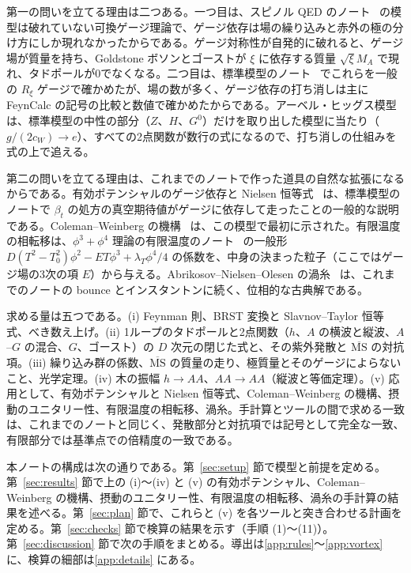 \documentclass[a4paper,10pt]{ltjsarticle}
\newcommand{\MSbar}{\overline{\mathrm{MS}}}
\begin{document}
第一の問いを立てる理由は二つある。一つ目は、スピノル QED のノート~\cite{qednote} の模型は破れていない可換ゲージ理論で、ゲージ依存は場の繰り込みと赤外の極の分け方にしか現れなかったからである。ゲージ対称性が自発的に破れると、ゲージ場が質量を持ち、Goldstone ボソンとゴーストが $\xi$ に依存する質量 $\sqrt\xi M_A$ で現れ、タドポールが0でなくなる。二つ目は、標準模型のノート~\cite{smnote} でこれらを一般の $R_\xi$ ゲージで確かめたが、場の数が多く、ゲージ依存の打ち消しは主に FeynCalc の記号の比較と数値で確かめたからである。アーベル・ヒッグス模型は、標準模型の中性の部分（$Z$、$H$、$G^0$）だけを取り出した模型に当たり（$g/(2c_W)\to e$）、すべての2点関数が数行の式になるので、打ち消しの仕組みを式の上で追える。

第二の問いを立てる理由は、これまでのノートで作った道具の自然な拡張になるからである。有効ポテンシャルのゲージ依存と Nielsen 恒等式~\cite{nielsen75} は、標準模型のノートで $\beta_t$ の処方の真空期待値がゲージに依存して走ったことの一般的な説明である。Coleman--Weinberg の機構~\cite{cw73} は、この模型で最初に示された。有限温度の相転移は、$\phi^3+\phi^4$ 理論の有限温度のノート~\cite{thermalnote} の一般形 $D(T^2-T_0^2)\phi^2-ET\phi^3+\lambda_T\phi^4/4$ の係数を、中身の決まった粒子（ここではゲージ場の3次の項 $E$）から与える。Abrikosov--Nielsen--Olesen の渦糸~\cite{abrikosov57,no73} は、これまでのノートの bounce とインスタントンに続く、位相的な古典解である。

求める量は五つである。(i) Feynman 則、BRST 変換と Slavnov--Taylor 恒等式、べき数え上げ。(ii) 1ループのタドポールと2点関数（$h$、$A$ の横波と縦波、$A$--$G$ の混合、$G$、ゴースト）の $D$ 次元の閉じた式と、その紫外発散と $\MSbar$ の対抗項。(iii) 繰り込み群の係数、$\MSbar$ の質量の走り、極質量とそのゲージによらないこと、光学定理。(iv) 木の振幅 $h\to AA$、$AA\to AA$（縦波と等価定理）。(v) 応用として、有効ポテンシャルと Nielsen 恒等式、Coleman--Weinberg の機構、摂動のユニタリー性、有限温度の相転移、渦糸。手計算とツールの間で求める一致は、これまでのノートと同じく、発散部分と対抗項では記号として完全な一致、有限部分では基準点での倍精度の一致である。

本ノートの構成は次の通りである。第~\ref{sec:setup} 節で模型と前提を定める。第~\ref{sec:results} 節で上の (i)〜(iv) と (v) の有効ポテンシャル、Coleman--Weinberg の機構、摂動のユニタリー性、有限温度の相転移、渦糸の手計算の結果を述べる。第~\ref{sec:plan} 節で、これらと (v) を各ツールと突き合わせる計画を定める。第~\ref{sec:checks} 節で検算の結果を示す（手順 (1)〜(11)）。第~\ref{sec:discussion} 節で次の手順をまとめる。導出は\ref{app:rules}〜\ref{app:vortex} に、検算の細部は\ref{app:details} にある。
\end{document}
